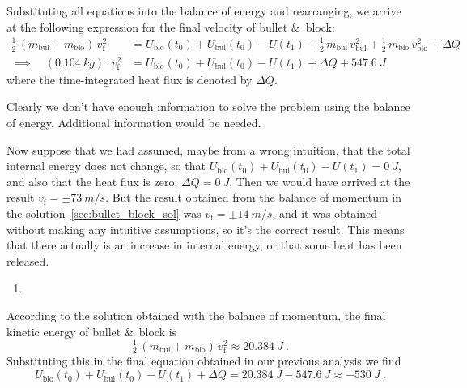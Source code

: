 \documentclass[a4paper,12pt,%
onecolumn,oneside,%
british%
]{memoir}
\newcommand*{\amp}{\&}
\newcommand*{\incr}{\Delta}%
\renewcommand*{\|}[1][]{\nonscript\:#1\vert\nonscript\:\mathopen{}}
\newcommand*{\yti}{t_{0}}
\newcommand*{\ytf}{t_{1}}
\newcommand*{\ym}{m}%
\newcommand*{\yU}{U}
\newcommand*{\yhe}{\incr Q}%
\begin{document}
Substituting all equations into the balance of energy and rearranging, we arrive at the following expression for the final velocity of bullet \amp\ block:
\begin{equation*}
  \begin{aligned}
    \tfrac12\,(\ym_{\textrm{bul}} + \ym_{\textrm{blo}})\, v_{\textrm{f}}^{2}
    &= \yU_{\textrm{blo}}(\yti) + \yU_{\textrm{bul}}(\yti) - \yU(\ytf)
    + \tfrac{1}{2}\,\ym_{\textrm{bul}}\, v_{\textrm{bul}}^{2}
    + \tfrac{1}{2}\,\ym_{\textrm{blo}}\, v_{\textrm{blo}}^{2}
    + \yhe
    \\[1ex]
    \implies\quad
    (\qty{0.104}{kg})\cdot v_{\textrm{f}}^{2}
    &= \yU_{\textrm{blo}}(\yti) + \yU_{\textrm{bul}}(\yti) - \yU(\ytf)
    +\yhe
    + \qty{547.6}{J}
  \end{aligned}
\end{equation*}
where the time-integrated heat flux is denoted by $\yhe$.

Clearly we don't have enough information to solve the problem using the balance of energy. Additional information would be needed.

Now suppose that we had assumed, maybe from a wrong intuition, that the total internal energy does not change, so that $\yU_{\textrm{blo}}(\yti) + \yU_{\textrm{bul}}(\yti) - \yU(\ytf) = \qty{0}{J}$, and also that the heat flux is zero: $\yhe = \qty{0}{J}$. Then  we would have arrived at the result ${v_{\textrm{f}} = \pm \qty{73}{m/s}}$. But the result obtained from the balance of momentum in the solution~\ref{sec:bullet_block_sol} was ${v_{\textrm{f}} = \pm \qty{14}{m/s}}$, and it was obtained without making any intuitive assumptions, so it's the correct result. This means that there actually is an increase in internal energy, or that some heat has been released.

\begin{enumerate}
\item 
\end{enumerate}
According to the solution obtained with the balance of momentum, the final kinetic energy of bullet \amp\ block is
\begin{equation*}
  \tfrac12\,(\ym_{\textrm{bul}} + \ym_{\textrm{blo}})\, v_{\textrm{f}}^{2}
  \approx \qty{20.384}{J} \ .
\end{equation*}
Substituting this in the final equation obtained in our previous analysis we find
\begin{equation*}
  \yU_{\textrm{blo}}(\yti) + \yU_{\textrm{bul}}(\yti) - \yU(\ytf)
  + \yhe
  = \qty{20.384}{J} - \qty{547.6}{J}
  \approx -\qty{530}{J} \ .
\end{equation*}
\end{document}
